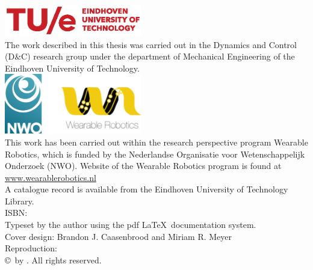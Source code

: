 \thispagestyle{empty}
\vspace*{30mm}\noindent
\begin{center}
{\LARGE\sf\maintitle}\\[4.5cm] %
{\Large\sf \@author}
\end{center}

\newpage
\thispagestyle{empty}

\vspace*{\fill}

\hspace*{-7mm}\includegraphics[width=6cm]{./img/TUeLOG_new.eps}\\
{\small The work described in this thesis was carried out in the Dynamics and Control (D\&C) research group under the department of Mechanical Engineering of the Eindhoven University of Technology. }\\[8mm]

\hspace*{-4mm}\includegraphics[width=6cm]{./img/NWO_WR.png}\\[2mm]
\noindent\bgroup\small
This work has been carried out within the research perspective program Wearable Robotics, which is funded by the Nederlandse Organisatie voor Wetenschappelijk Onderzoek (NWO). Website of the Wearable Robotics program is found at \url{www.wearablerobotics.nl} \\[.5mm]

\noindent\bgroup\small
A catalogue record is available from the Eindhoven University of Technology Library.\\
ISBN: \isbn\\[4mm]
Typeset by the author using the pdf \LaTeX \ documentation system.\\
Cover design: Brandon J. Caasenbrood and Miriam R. Meyer \\
Reproduction: \printer\\[8mm]
\copyright\year\, by \@author. All rights reserved.}
\egroup

